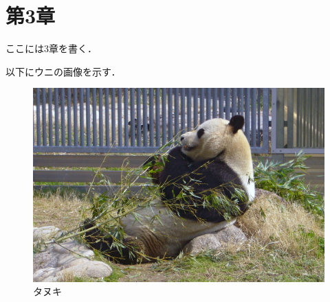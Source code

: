 \section{第3章}
\label{sec:3}

ここには3章を書く．

以下にウニの画像を示す．

\begin{figure}[b]
    \centering
    \includegraphics[width=0.8\linewidth]{figs_sample/crab.jpg}
    \caption{タヌキ}
    \label{fig:dog}
\end{figure}

